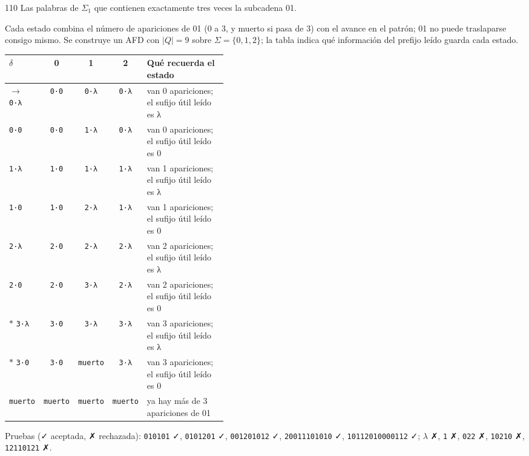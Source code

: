 \documentclass[11pt]{article}
\begin{document}
\begin{ejercicio}{110}{}
Las palabras de $\Sigma_1$ que contienen exactamente tres veces la subcadena 01.
\end{ejercicio}
\proc Cada estado combina el número de apariciones de 01 (0 a 3, y muerto si pasa de 3) con el avance en el patrón; 01 no puede traslaparse consigo mismo. Se construye un AFD con $|Q| = 9$ sobre $\Sigma = \{0, 1, 2\}$; la tabla indica qué información del prefijo leído guarda cada estado.
\begin{center}\small\begin{tabular}{lcccp{0.42\linewidth}}\toprule
$\delta$ & 0 & 1 & 2 & Qué recuerda el estado \\\midrule
$\to$ \texttt{0·λ} & \texttt{0·0} & \texttt{0·λ} & \texttt{0·λ} & van 0 apariciones; el sufijo útil leído es λ \\
 \texttt{0·0} & \texttt{0·0} & \texttt{1·λ} & \texttt{0·λ} & van 0 apariciones; el sufijo útil leído es 0 \\
 \texttt{1·λ} & \texttt{1·0} & \texttt{1·λ} & \texttt{1·λ} & van 1 apariciones; el sufijo útil leído es λ \\
 \texttt{1·0} & \texttt{1·0} & \texttt{2·λ} & \texttt{1·λ} & van 1 apariciones; el sufijo útil leído es 0 \\
 \texttt{2·λ} & \texttt{2·0} & \texttt{2·λ} & \texttt{2·λ} & van 2 apariciones; el sufijo útil leído es λ \\
 \texttt{2·0} & \texttt{2·0} & \texttt{3·λ} & \texttt{2·λ} & van 2 apariciones; el sufijo útil leído es 0 \\
$*$ \texttt{3·λ} & \texttt{3·0} & \texttt{3·λ} & \texttt{3·λ} & van 3 apariciones; el sufijo útil leído es λ \\
$*$ \texttt{3·0} & \texttt{3·0} & \texttt{muerto} & \texttt{3·λ} & van 3 apariciones; el sufijo útil leído es 0 \\
 \texttt{muerto} & \texttt{muerto} & \texttt{muerto} & \texttt{muerto} & ya hay más de 3 apariciones de 01 \\
\bottomrule\end{tabular}\end{center}
Pruebas (✓ aceptada, ✗ rechazada): \texttt{010101} ✓, \texttt{0101201} ✓, \texttt{001201012} ✓, \texttt{20011101010} ✓, \texttt{10112010000112} ✓; $\lambda$ ✗, \texttt{1} ✗, \texttt{022} ✗, \texttt{10210} ✗, \texttt{12110121} ✗.
\end{document}
